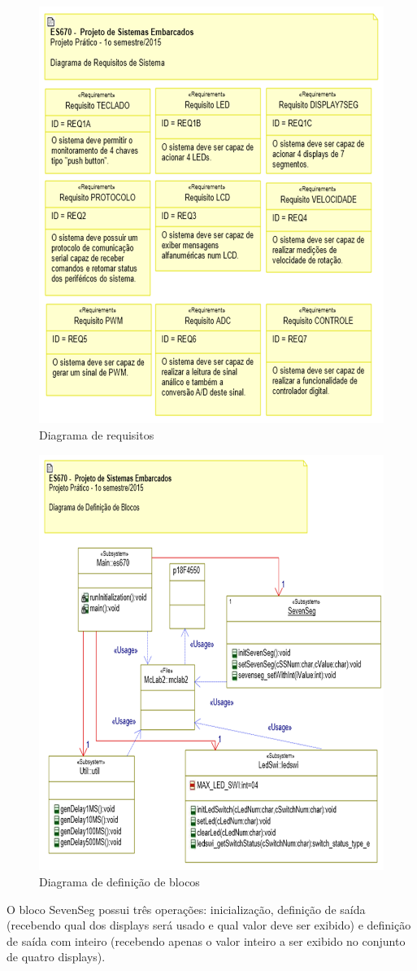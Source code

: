 \documentclass{article}
\begin{document}
\begin{figure}[H]
	\centering
	\includegraphics[width=0.9\linewidth]{requisitos}
	\caption{Diagrama de requisitos}
	\label{fig:requisitos}
\end{figure}
\begin{figure}[H]
	\centering
	\includegraphics[width=0.9\linewidth]{blocos}
	\caption{Diagrama de definição de blocos}
	\label{fig:blocos}
\end{figure}
O bloco SevenSeg possui três operações: inicialização, definição de saída (recebendo qual dos displays será usado e qual valor deve ser exibido) e definição de saída com inteiro (recebendo apenas o valor inteiro a ser exibido no conjunto de quatro displays).
\end{document}
